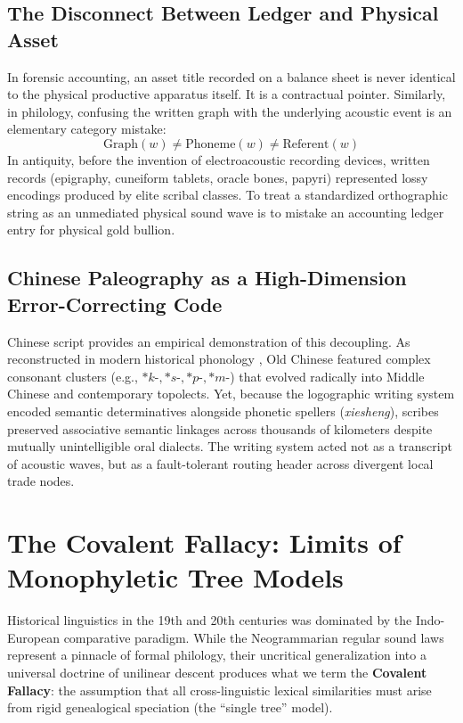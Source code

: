 \documentclass[11pt,a4paper]{article}
\begin{document}
\subsection{The Disconnect Between Ledger and Physical Asset}
In forensic accounting, an asset title recorded on a balance sheet is never identical to the physical productive apparatus itself. It is a contractual pointer. Similarly, in philology, confusing the written graph with the underlying acoustic event is an elementary category mistake:
\begin{equation}
    \text{Graph}(w) \neq \text{Phoneme}(w) \neq \text{Referent}(w)
\end{equation}
In antiquity, before the invention of electroacoustic recording devices, written records (epigraphy, cuneiform tablets, oracle bones, papyri) represented lossy encodings produced by elite scribal classes. To treat a standardized orthographic string as an unmediated physical sound wave is to mistake an accounting ledger entry for physical gold bullion.

\subsection{Chinese Paleography as a High-Dimension Error-Correcting Code}
Chinese script provides an empirical demonstration of this decoupling. As reconstructed in modern historical phonology \cite{baxter2014old}, Old Chinese featured complex consonant clusters (e.g., $*k\text{-}, *s\text{-}, *p\text{-}, *m\text{-}$) that evolved radically into Middle Chinese and contemporary topolects. Yet, because the logographic writing system encoded semantic determinatives alongside phonetic spellers (\textit{xiesheng}), scribes preserved associative semantic linkages across thousands of kilometers despite mutually unintelligible oral dialects. The writing system acted not as a transcript of acoustic waves, but as a fault-tolerant routing header across divergent local trade nodes.

\section{The Covalent Fallacy: Limits of Monophyletic Tree Models}

Historical linguistics in the 19th and 20th centuries was dominated by the Indo-European comparative paradigm. While the Neogrammarian regular sound laws represent a pinnacle of formal philology, their uncritical generalization into a universal doctrine of unilinear descent produces what we term the \textbf{Covalent Fallacy}: the assumption that all cross-linguistic lexical similarities must arise from rigid genealogical speciation (the ``single tree'' model).
\end{document}

